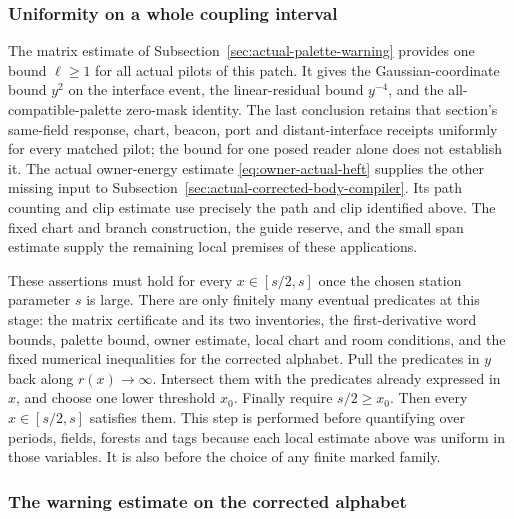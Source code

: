 \subsubsection{Uniformity on a whole coupling interval}

The matrix estimate of Subsection~\ref{sec:actual-palette-warning} provides
one bound $\ell\geq1$ for all actual pilots of this patch. It gives the
Gaussian-coordinate bound $y^2$ on the interface event, the linear-residual
bound $y^{-4}$, and the all-compatible-palette zero-mask identity.
The last conclusion retains that section's same-field response, chart,
beacon, port and distant-interface receipts uniformly for every matched pilot;
the bound for one posed reader alone does not establish it.
The actual owner-energy estimate
\eqref{eq:owner-actual-heft} supplies the other missing input to
Subsection~\ref{sec:actual-corrected-body-compiler}. Its path counting and
clip estimate use precisely the path and clip identified above. The
fixed chart and branch construction, the guide reserve, and the small
span estimate supply the remaining local premises of these applications.

These assertions must hold for every $x\in[s/2,s]$ once the chosen
station parameter $s$ is large. There are only finitely many eventual
predicates at this stage: the matrix certificate and its two inventories,
the first-derivative word bounds, palette bound, owner estimate, local
chart and room conditions, and the fixed numerical inequalities for the
corrected alphabet. Pull the predicates in $y$ back along $r(x)\to\infty$.
Intersect them with the predicates already expressed in $x$, and choose
one lower threshold $x_0$. Finally require $s/2\geq x_0$.
Then every $x\in[s/2,s]$ satisfies them. This step is performed before
quantifying over periods, fields, forests and tags because each local
estimate above was uniform in those variables. It is also before the
choice of any finite marked family.

\subsubsection{The warning estimate on the corrected alphabet}

